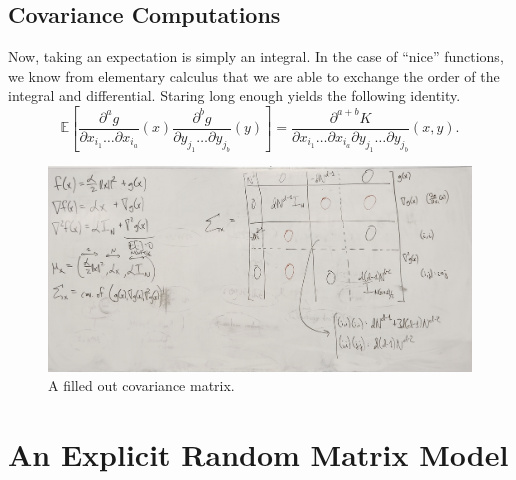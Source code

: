 \documentclass[12pt]{article}
\newcommand{\E}{\mathbb{E}}
\begin{document}
\subsection{Covariance Computations}
Now,
taking an expectation is simply an integral.
In the case of ``nice'' functions,
we know from elementary calculus that we are able to exchange the order of the integral and differential.
Staring long enough yields the following identity.
\[
  \E\left[ \frac{\partial^a g}{\partial x_{i_1}\dots \partial x_{i_a}}(x) \frac{\partial^b g}{\partial y_{j_1}\dots \partial y_{j_b}}(y) \right]
  = \frac{\partial^{a+b} K}{\partial x_{i_1}\dots \partial x_{i_a} \partial y_{j_1}\dots \partial y_{j_b}} (x, y).
\]

\begin{figure}[h]
  \centering
  \includegraphics[width=\linewidth]{fig/filled_matrix.jpeg}
  \caption{A filled out covariance matrix.}
  \label{fig:filled matrix}
\end{figure}

\section{An Explicit Random Matrix Model}
\end{document}
